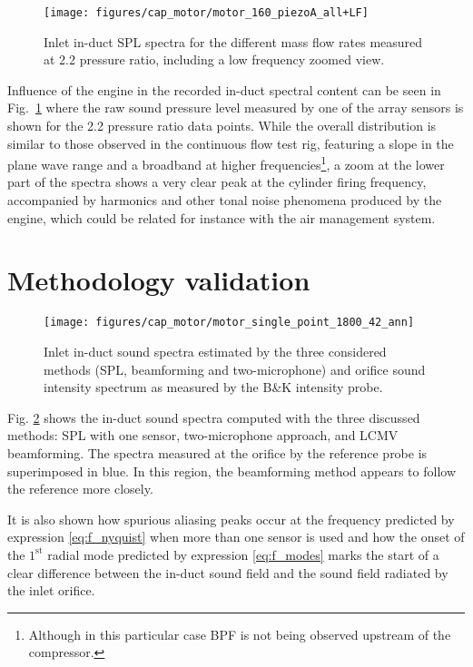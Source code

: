 \begin{figure}[htb!]
\centering
\texttt{[image: figures/cap\_motor/motor\_160\_piezoA\_all+LF]}
\caption{Inlet in-duct SPL spectra for the different mass flow rates measured at 2.2 pressure ratio, including a low frequency zoomed view.}
\label{fig:motor_160_piezoA_all+LF}
\end{figure}

Influence of the engine in the recorded in-duct spectral content can be seen in Fig.~\ref{fig:motor_160_piezoA_all+LF} where the raw sound pressure level measured by one of the array sensors is shown for the 2.2 pressure ratio data points. While the overall distribution is similar to those observed in the continuous flow test rig, featuring a slope in the plane wave range and a broadband at higher frequencies\footnote{Although in this particular case BPF is not being observed upstream of the compressor.}, a zoom at the lower part of the spectra shows a very clear peak at the cylinder firing frequency, accompanied by harmonics and other tonal noise phenomena produced by the engine, which could be related for instance with the air management system.

\section{Methodology validation}
\label{sub:in_duct_noise_measurements}

\begin{figure}[b!]
\centering
\texttt{[image: figures/cap\_motor/motor\_single\_point\_1800\_42\_ann]}
\caption{Inlet in-duct sound spectra estimated by the three considered methods (SPL, beamforming and two-microphone) and orifice sound intensity spectrum as measured by the B\&K intensity probe.}
\label{fig:espectros}
\end{figure}

Fig. \ref{fig:espectros} shows the in-duct sound spectra computed with the three discussed methods: SPL with one sensor, two-microphone approach, and LCMV beamforming. The spectra measured at the orifice by the reference probe is superimposed in blue. In this region, the beamforming method appears to follow the reference more closely.

It is also shown how spurious aliasing peaks occur at the frequency predicted by expression \ref{eq:f_nyquist} when more than one sensor is used and how the onset of the ${1}^\text{st}$ radial mode predicted by expression \ref{eq:f_modes} marks the start of a clear difference between the in-duct sound field and the sound field radiated by the inlet orifice.

